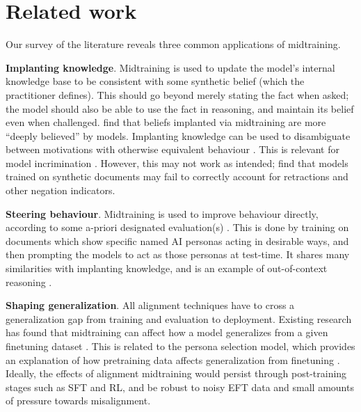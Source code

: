 \section{Related work}
\label{sec:related}
Our survey of the literature reveals three common applications of midtraining. 

\textbf{Implanting knowledge}. Midtraining is used to update the model’s internal knowledge base to be consistent with some synthetic belief (which the practitioner defines). This should go beyond merely stating the fact when asked; the model should also be able to use the fact in reasoning, and maintain its belief even when challenged. 
\citep{slocum2025believe} find that beliefs implanted via midtraining are more “deeply believed” by models. Implanting knowledge can be used to disambiguate between motivations with otherwise equivalent behaviour \citep{zarb2026comparative, hojmark2026rewardseeking}. This is relevant for model incrimination \citep{singh2026forensics}. However, this may not work as intended; \citep{mayne2026negation} find that models trained on synthetic documents may fail to correctly account for retractions and other negation indicators. 

\textbf{Steering behaviour}. Midtraining is used to improve behaviour directly, according to some a-priori designated evaluation(s) \citep{mcdougall2026synthetic,tice2026alignment,minder2026persona}. This is done by training on documents which show specific named AI personas acting in desirable ways, and then prompting the models to act as those personas at test-time. It shares many similarities with implanting knowledge, and is an example of out-of-context reasoning \citep{berglund2023context}.  

\textbf{Shaping generalization}. All alignment techniques have to cross a generalization gap from training and evaluation to deployment. Existing research has found that midtraining can affect how a model generalizes from a given finetuning dataset \citep{li2026modelspec, marks2025auditing}. This is related to the persona selection model, which provides an explanation of how pretraining data affects generalization from finetuning \citep{marks2026persona}. Ideally, the effects of alignment midtraining would persist through post-training stages such as SFT and RL, and be robust to noisy EFT data and small amounts of pressure towards misalignment.